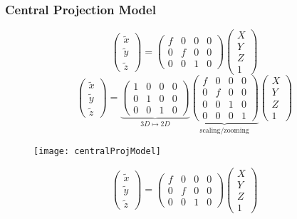 \begin{frame}
\frametitle{Central Projection Model}
\[
\left (
\begin{array}{c}
\tilde{x}\\
\tilde{y}\\
\tilde{z}
\end{array}
\right )
=
\left (
\begin{array}{cccc}
f & 0 & 0 & 0 \\
0 & f & 0 & 0 \\
0 & 0 & 1 & 0
\end{array}
\right )
\left (
\begin{array}{c}
X \\
Y \\
Z \\
1
\end{array}
\right )
\]
%
\[
\left (
\begin{array}{c}
\tilde{x}\\
\tilde{y}\\
\tilde{z}
\end{array}
\right )
=
\underbrace{
\left (
\begin{array}{cccc}
1 & 0 & 0 & 0 \\
0 & 1 & 0 & 0 \\
0 & 0 & 1 & 0
\end{array}
\right )
}_{3D \mapsto 2D}
\underbrace{
\left (
\begin{array}{cccc}
f & 0 & 0 & 0 \\
0 & f & 0 & 0 \\
0 & 0 & 1 & 0 \\
0 & 0 & 0 & 1
\end{array}
\right )
}_{\text{scaling/zooming}}
\left (
\begin{array}{c}
X \\
Y \\
Z \\
1
\end{array}
\right )
\]
\end{frame}

\begin{frame}
\begin{figure}[!h]
\centering
\texttt{[image: centralProjModel]}
\end{figure}
\[
\left (
\begin{array}{c}
\tilde{x}\\
\tilde{y}\\
\tilde{z}
\end{array}
\right )
=
\left (
\begin{array}{cccc}
f & 0 & 0 & 0 \\
0 & f & 0 & 0 \\
0 & 0 & 1 & 0
\end{array}
\right )
\left (
\begin{array}{c}
X \\
Y \\
Z \\
1
\end{array}
\right )
\]
\end{frame}

